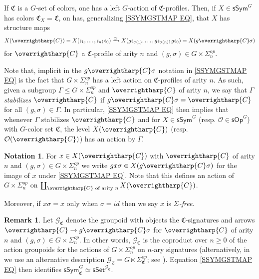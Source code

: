 \documentclass[a4paper,10pt]{article}%
\numberwithin{equation}{section}
\numberwithin{figure}{section}
\theoremstyle{definition} %
\newtheorem{remark}[equation]{Remark}%
\newtheorem{notation}[equation]{Notation}%
\newcommand{\vect}[1]{\text{\overrightharp{\ensuremath{#1}}}}
\renewcommand{\O}{\ensuremath{\mathcal O}}
\newcommand{\1}{\ensuremath{\mathbbm 1}}%
\begin{document}
If $\mathfrak{C}$ is a $G$-set of colors, 
one has a left $G$-action of $\mathfrak{C}$-profiles.
Then, if $X \in \mathsf{sSym}^G$
has colors $\mathfrak{C}_X =\mathfrak{C}$,
on has, generalizing
\eqref{SSYMGSTMAP EQ},
that $X$ has structure maps
\begin{equation}\label{SSYMGSTMAP EQ}
X(\vect{C}) = 
X(\mathfrak c_1, \dots, \mathfrak c_n; \mathfrak c_0) \xrightarrow{\simeq} 
X(g\mathfrak c_{\sigma(1)}, \dots, g \mathfrak c_{\sigma(n)}; g \mathfrak c_0) =	
X(g \vect{C}\sigma)
\end{equation}
for $\vect{C}$ a $\mathfrak{C}$-profile of arity $n$
and
$(g,\sigma) \in G \times \Sigma^{op}_n$.

Note that, implicit in the $g \vect{C} \sigma$ notation in
\eqref{SSYMGSTMAP EQ}
is the fact that $G \times \Sigma_n^{op}$
has a left action on 
$\mathfrak{C}$-profiles of arity $n$.
As such, given a subgroup
$\Gamma \leq G \times \Sigma_n^{op}$
and $\vect{C}$ of arity $n$, we say that 
\emph{$\Gamma$ stabilizes $\vect{C}$} 
if 
$g \vect{C} \sigma = \vect{C}$
for all $(g,\sigma) \in \Gamma$.
In particular, 
\eqref{SSYMGSTMAP EQ}
then implies that whenever $\Gamma$ stabilizes $\vect{C}$
and for
$X\in \mathsf{sSym}^G$
(resp.
$\O \in \mathsf{sOp}^G$)
with $G$-color set $\mathfrak{C}$,
the level
$X(\vect{C})$
(resp. $\O(\vect{C})$)
has an action by $\Gamma$.


\begin{notation}\label{SIGFREE NOT}
	For $x \in X(\vect{C})$
	with $\vect{C}$ of arity $n$ and 
	$(g,\sigma) \in G \times \Sigma_n^{op}$
	we write
	$gx\sigma \in X(g \vect{C} \sigma)$
	for the image of $x$ under 
	\eqref{SSYMGSTMAP EQ}.
	Note that this defines an action of
	$G \times \Sigma_n^{op}$
	on $\coprod_{\vect{C} \text{ of arity }n} X(\vect{C})$.
	
	Moreover, if $x \sigma = x$ only when $\sigma = id$ then we say 
	$x$ is \emph{$\Sigma$-free}.
\end{notation}




\begin{remark}\label{SYMGCPRESH REM}
	Let $\mathcal{G}_{\mathfrak{C}}$
	denote the groupoid with objects the 
	$\mathfrak{C}$-signatures
	and arrows 
	$\vect{C} \to g \vect{C} \sigma$
	for $\vect{C}$ of arity $n$
	and $(g,\sigma) \in G \times \Sigma^{op}_n$.
	In other words, 
	$\mathcal{G}_{\mathfrak{C}}$
	is the coproduct over $n\geq 0$ of the action groupoids 
	for the actions of
	$G \times \Sigma^{op}_n$
	on $n$-ary signatures
	(alternatively, in 
	\cite{BP_HGOP} 
	we use an alternative description
	$\mathcal{G}_{\mathfrak{C}}
	= G \ltimes \Sigma_{\mathfrak{C}}^{op}$;
	see \cite[Prop. 2.52]{BP_HGOP}).
%	
	Equation \eqref{SSYMGSTMAP EQ} then identifies 
	$\mathsf{sSym}^G_{\mathfrak{C}} \simeq 
	\mathsf{sSet}^{\mathcal{G}_{\mathfrak{C}}}$.	
\end{remark}
\end{document}
